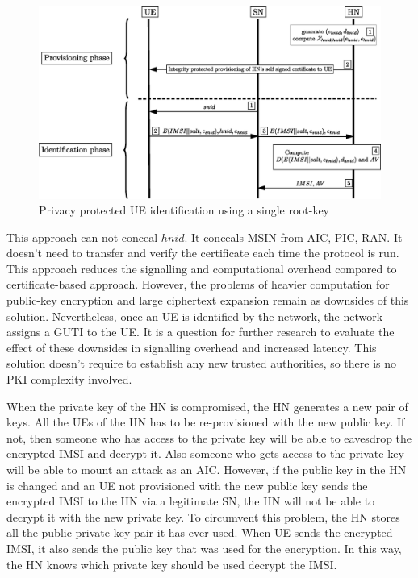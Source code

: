 \documentclass[lnicst,sechang,a4paper]{svmultln}
\begin{document}
\begin{figure}
\begin{center}
  \includegraphics[width=.98\textwidth]{root-key1.eps}
\caption{Privacy protected UE identification using a single root-key}
\label{fig:solution_root-key1}       %
\end{center}
\end{figure}



This approach can not conceal $hnid$. It conceals MSIN from AIC, PIC, RAN. It doesn't need to transfer and verify the certificate each time the protocol is run. This approach reduces the signalling and computational overhead compared to certificate-based approach. However, the problems of heavier computation for public-key encryption and large ciphertext expansion remain as downsides of this solution.  Nevertheless, once an UE is identified by the network, the network assigns a GUTI to the UE. It is a question for further research to evaluate the effect of these downsides in signalling overhead and increased latency. This solution doesn't require to establish any new trusted authorities, so there is no PKI complexity involved.

When the private key of the HN is compromised, the HN generates a new pair of keys. All the UEs of the HN has to be re-provisioned with the new public key. If not, then someone who has access to the private key will be able to eavesdrop the encrypted IMSI and decrypt it. Also someone who gets access to the private key will be able to mount an attack as an AIC. However, if the public key in the HN is changed and an UE not provisioned with the new public key sends the encrypted IMSI to the HN via a legitimate SN, the HN will not be able to decrypt it with the new private key. To circumvent this problem, the HN stores all the public-private key pair it has ever used. When UE sends the encrypted IMSI, it also sends the public key that was used for the encryption. In this way, the HN knows which private key should be used decrypt the IMSI. 
\end{document}
